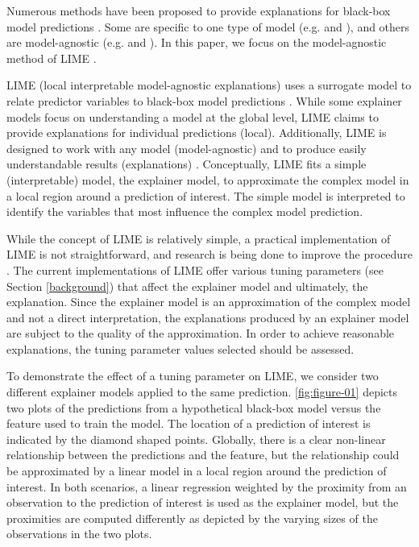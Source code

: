\documentclass[AMS,STIX2COL]{WileyNJD-v2}\usepackage[]{graphicx}\usepackage[]{color}
\begin{document}
Numerous methods have been proposed to provide explanations for black-box model predictions \citep{gilpin:2018, guidotti:2018, ming:2017, molnar:2019}. Some are specific to one type of model (e.g. \citep{simonyan:2013} and \citep{urbanek:2008}), and others are model-agnostic (e.g. \citep{fisher:2018} and \citep{strumbelj:2014}). In this paper, we focus on the  model-agnostic method of LIME \citep{ribeiro:2016}.

LIME (local interpretable model-agnostic explanations) uses a surrogate model to relate predictor variables to black-box model predictions  \citep{ribeiro:2016}. While some explainer models focus on understanding a model at the global level, LIME claims to provide explanations for individual predictions (local). Additionally, LIME is designed to work with any model (model-agnostic) and to produce easily understandable results (explanations) \citep{ribeiro:2016}. Conceptually, LIME fits a simple (interpretable) model, the explainer model, to approximate  the complex model in a local region around a prediction of interest. The simple model is interpreted to identify the variables that most influence the complex model prediction.

While the concept of LIME is relatively simple, a practical implementation of LIME is not straightforward, and research is being done to improve the procedure \citep{laugel:2018}. The current implementations of LIME \citep{pedersen:2020, ribeiro:2020} offer various tuning parameters (see Section \ref{background}) that affect the explainer model and ultimately, the explanation. Since the explainer model is an approximation of the complex model and not a direct interpretation, the explanations produced by an explainer model are subject to the quality of the approximation. In order to achieve reasonable explanations, the tuning parameter values selected should  be assessed.

To demonstrate the effect of a tuning parameter on LIME, we consider two different explainer models applied to the same prediction. \autoref{fig:figure-01} depicts two plots of the predictions from a hypothetical black-box model versus the feature used to train the model. The location of a prediction of interest is indicated by the diamond shaped points. Globally, there is a clear non-linear relationship between the predictions and the feature, but the relationship could be approximated by a linear model in a local region around the prediction of interest. In both scenarios, a linear regression weighted by the proximity from an observation to the prediction of interest is used as the explainer model, but the proximities are computed differently as depicted by the varying sizes of the observations in the two plots.
\end{document}
